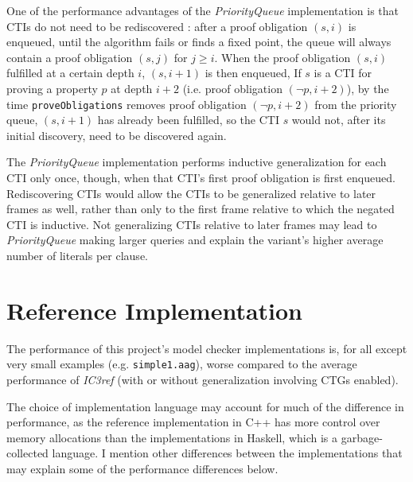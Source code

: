 \documentclass[12pt,a4paper,twoside,openright]{report}
\begin{document}
{{One of the performance advantages of the \emph{PriorityQueue} implementation is that CTIs do not need
to be rediscovered \cite{een11}: after a proof obligation $(s,i)$ is enqueued, until the algorithm fails or finds a fixed point,
the queue will always contain a proof obligation $(s,j)$ for $j \geq i$. When the proof obligation $(s,i)$
fulfilled at a certain depth $i$, $(s,i + 1)$ is then enqueued, If $s$ is a CTI for proving a property
$p$ at depth $i + 2$ (i.e. proof obligation $(\neg p, i + 2)$), by the time \verb,proveObligations, removes
proof obligation $(\neg p, i + 2)$ from the priority queue, $(s, i+1)$ has already been fulfilled, so the
CTI $s$ would not, after its initial discovery, need to be discovered again.


The \emph{PriorityQueue} implementation performs inductive generalization for each CTI only once, though,
when that CTI's first proof obligation is first enqueued. Rediscovering CTIs would allow the CTIs to
be generalized relative to later frames as well, rather than only to the first frame relative to which
the negated CTI is inductive. Not generalizing CTIs relative to later frames may lead to
\emph{PriorityQueue} making larger queries and explain the variant's higher average number of
literals per clause.
}

\section{Reference Implementation}
\label{eval:ic3ref}

The performance of this project's model checker implementations is, for all except very small examples
(e.g. \verb,simple1.aag,),
worse compared to the average performance of \emph{IC3ref}
(with or without generalization involving CTGs enabled).

The choice of implementation language may account for much of the difference in performance, as the reference
implementation in C++ has more control over memory allocations than the implementations in Haskell, which is
a garbage-collected language. I mention other differences between the implementations that may explain
some of the performance differences below.

}
\end{document}
